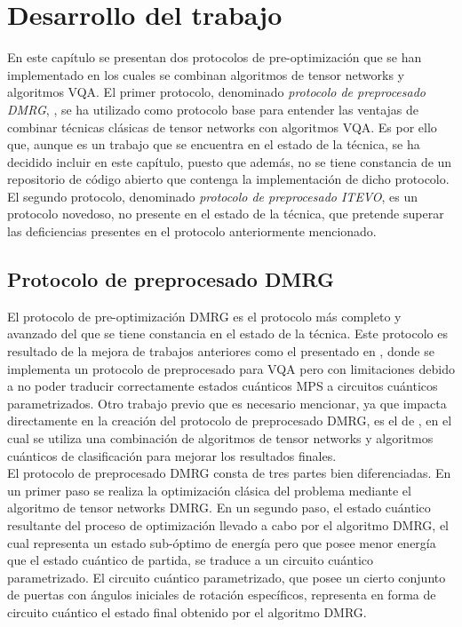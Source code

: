 \chapter{Desarrollo del trabajo}

En este capítulo se presentan dos protocolos de pre-optimización que se han implementado en los cuales se combinan algoritmos de tensor networks y algoritmos VQA. El primer protocolo, denominado \textit{protocolo de preprocesado DMRG}, \citep{manuel}, se ha utilizado como protocolo base para entender las ventajas de combinar técnicas clásicas de tensor networks con algoritmos VQA. Es por ello que, aunque es un trabajo que se encuentra en el estado de la técnica, se ha decidido incluir en este capítulo, puesto que además, no se tiene constancia de un repositorio de código abierto que contenga la implementación de dicho protocolo. El segundo protocolo, denominado \textit{protocolo de preprocesado ITEVO}, es un protocolo novedoso, no presente en el estado de la técnica, que pretende superar las deficiencias presentes en el protocolo anteriormente mencionado. 

\section{Protocolo de preprocesado DMRG}

El protocolo de pre-optimización DMRG es el protocolo más completo y avanzado del que se tiene constancia en el estado de la técnica. Este protocolo es resultado de la mejora de trabajos anteriores como el presentado en \cite{dborin}, donde se implementa un protocolo de preprocesado para VQA pero con limitaciones debido a no poder traducir correctamente estados cuánticos MPS a circuitos cuánticos parametrizados. Otro trabajo previo que es necesario mencionar, ya que impacta directamente en la creación del protocolo de preprocesado DMRG, es el de \cite{huggins}, en el cual se utiliza una combinación de algoritmos de tensor networks y algoritmos cuánticos de clasificación para mejorar los resultados finales. \\

El protocolo de preprocesado DMRG consta de tres partes bien diferenciadas. En un primer paso se realiza la optimización clásica del problema mediante el algoritmo de tensor networks DMRG. En un segundo paso, el estado cuántico resultante del proceso de optimización llevado a cabo por el algoritmo DMRG, el cual representa un estado sub-óptimo de energía pero que posee menor energía que el estado cuántico de partida, se traduce a un circuito cuántico parametrizado. El circuito cuántico parametrizado, que posee un cierto conjunto de puertas con ángulos iniciales de rotación específicos, representa en forma de circuito cuántico el estado final obtenido por el algoritmo DMRG. 

